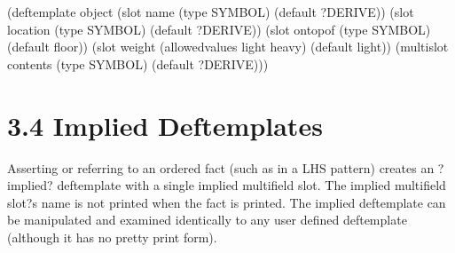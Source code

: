 \documentclass[letterpaper,10pt,english]{sphinxmanual}
\begin{document}

\begin{sphinxVerbatim}[commandchars=\\\{\}]
(deftemplate object
  (slot name (type SYMBOL) (default ?DERIVE))
  (slot location (type SYMBOL) (default ?DERIVE))
  (slot on\PYGZhy{}top\PYGZhy{}of (type SYMBOL) (default floor))
  (slot weight (allowed\PYGZhy{}values light heavy) (default light))
  (multislot contents (type SYMBOL) (default ?DERIVE)))
\end{sphinxVerbatim}


\section{3.4 Implied Deftemplates}
\label{\detokenize{deftemplate:implied-deftemplates}}
Asserting or referring to an ordered fact (such as in a LHS pattern)
creates an ?implied? deftemplate with a single implied multifield slot.
The implied multifield slot?s name is not printed when the fact is
printed. The implied deftemplate can be manipulated and examined
identically to any user defined deftemplate (although it has no pretty
print form).


\begin{sphinxVerbatim}[commandchars=\\\{\}]
 
     
       
 
     
 
 
    
     
\end{sphinxVerbatim}
\label{\detokenize{deftemplate:section-1}}
\end{document}
